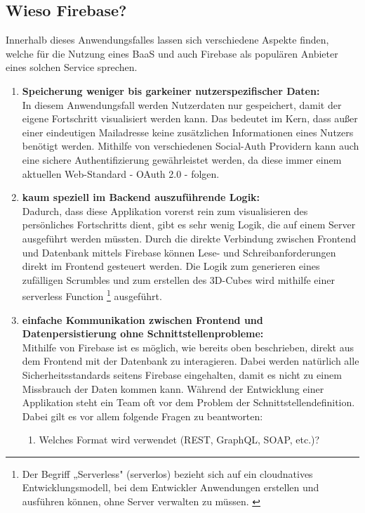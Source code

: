 \begin{definition}
    \subsection{Wieso Firebase?}
    Innerhalb dieses Anwendungsfalles lassen sich verschiedene Aspekte finden, welche für die Nutzung eines BaaS und auch Firebase als populären Anbieter eines solchen Service sprechen.
    \begin{enumerate}
        \item \textbf{Speicherung weniger bis garkeiner nutzerspezifischer Daten:}\\
              In diesem Anwendungsfall werden Nutzerdaten nur gespeichert, damit der eigene Fortschritt visualisiert werden kann. Das bedeutet im Kern, dass außer einer eindeutigen Mailadresse keine zusätzlichen Informationen eines Nutzers benötigt werden. Mithilfe von verschiedenen Social-Auth Providern kann auch eine sichere Authentifizierung gewährleistet werden, da diese immer einem aktuellen Web-Standard - OAuth 2.0 - folgen.
        \item \textbf{kaum speziell im Backend auszuführende Logik:}\\
              Dadurch, dass diese Applikation vorerst rein zum visualisieren des persönliches Fortschritts dient, gibt es sehr wenig Logik, die auf einem Server ausgeführt werden müssten. Durch die direkte Verbindung zwischen Frontend und Datenbank mittels Firebase können Lese- und Schreibanforderungen direkt im Frontend gesteuert werden. Die Logik zum generieren eines zufälligen Scrumbles und zum erstellen des 3D-Cubes wird mithilfe einer serverless Function \footnote{Der Begriff „Serverless" (serverlos) bezieht sich auf ein cloudnatives Entwicklungsmodell, bei dem Entwickler Anwendungen erstellen und ausführen können, ohne Server verwalten zu müssen. \cite{redhat}} ausgeführt.
        \item \textbf{einfache Kommunikation zwischen Frontend und Datenpersistierung ohne Schnittstellenprobleme:}\\
              Mithilfe von Firebase ist es möglich, wie bereits oben beschrieben, direkt aus dem Frontend mit der Datenbank zu interagieren. Dabei werden natürlich alle Sicherheitsstandards seitens Firebase eingehalten, damit es nicht zu einem Missbrauch der Daten kommen kann. Während der Entwicklung einer Applikation steht ein Team oft vor dem Problem der Schnittstellendefinition. Dabei gilt es vor allem folgende Fragen zu beantworten:
              \begin{enumerate}
                  \item Welches Format wird verwendet (REST, GraphQL, SOAP, etc.)?

\end{enumerate}
\end{enumerate}
\end{definition}
